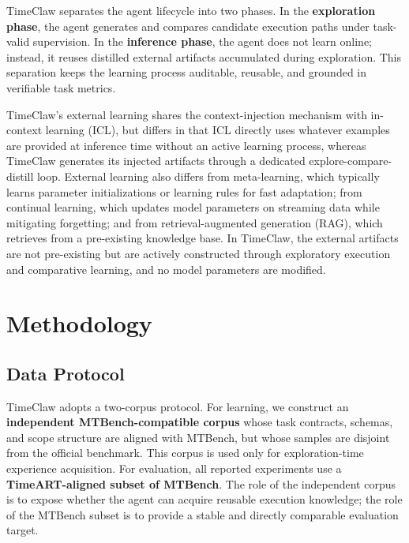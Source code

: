 TimeClaw separates the agent lifecycle into two phases. In the \textbf{exploration phase}, the agent generates and compares candidate execution paths under task-valid supervision. In the \textbf{inference phase}, the agent does not learn online; instead, it reuses distilled external artifacts accumulated during exploration. This separation keeps the learning process auditable, reusable, and grounded in verifiable task metrics.

\begin{remark}
\label{rem:paradigms}
TimeClaw's external learning shares the context-injection mechanism with in-context learning (ICL), but differs in that ICL directly uses whatever examples are provided at inference time without an active learning process, whereas TimeClaw generates its injected artifacts through a dedicated explore-compare-distill loop. External learning also differs from meta-learning, which typically learns parameter initializations or learning rules for fast adaptation; from continual learning, which updates model parameters on streaming data while mitigating forgetting; and from retrieval-augmented generation (RAG), which retrieves from a pre-existing knowledge base. In TimeClaw, the external artifacts are not pre-existing but are actively constructed through exploratory execution and comparative learning, and no model parameters are modified.
\end{remark}


\section{Methodology}
\label{sec:method}

\subsection{Data Protocol}
\label{sec:data}

TimeClaw adopts a two-corpus protocol. For learning, we construct an \textbf{independent MTBench-compatible corpus} whose task contracts, schemas, and scope structure are aligned with MTBench, but whose samples are disjoint from the official benchmark. This corpus is used only for exploration-time experience acquisition. For evaluation, all reported experiments use a \textbf{TimeART-aligned subset of MTBench}. The role of the independent corpus is to expose whether the agent can acquire reusable execution knowledge; the role of the MTBench subset is to provide a stable and directly comparable evaluation target.

